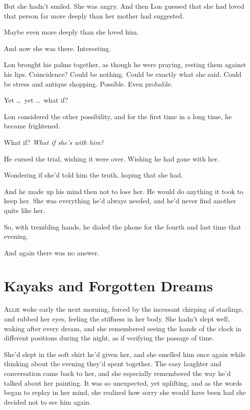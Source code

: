 \documentclass[10pt, twoside, openright]{book}
\newcommand{\chapterornament}[1]{\def\currentornament{#1}}
\def\currentornament{}
\begin{document}
But she hadn't smiled. She was angry. And then Lon guessed that she had
loved that person far more deeply than her mother had suggested.

Maybe even more deeply than she loved him.


And now she was there. Interesting.


Lon brought his palms together, as though he were praying, resting them
against his lips. Coincidence? Could be nothing. Could be exactly what
she said. Could be stress and antique shopping. Possible. Even probable.


Yet   \dots\ yet   \dots\ what if?


Lon considered the other possibility, and for the first time in a long
time, he became frightened.


What if? \emph{What if she's with him?}

He cursed the trial, wishing it were over. Wishing he had gone with her.


Wondering if she'd told him the truth, hoping that she had.

And he made up his mind then not to lose her. He would do anything it
took to keep her. She was everything he'd always needed, and he'd never
find another quite like her.

So, with trembling hands, he dialed the phone for the fourth and last
time that evening.


And again there was no answer.

\chapterornament{89}
\chapter{Kayaks and Forgotten Dreams}

\lettrine[findent=0.3em, nindent=0.0em]{A}{llie} woke early the next morning, forced by the incessant chirping of
starlings, and rubbed her eyes, feeling the stiffness in her body. She
hadn't slept well, waking after every dream, and she remembered seeing
the hands of the clock in different positions during the night, as if
verifying the passage of time.

She'd slept in the soft shirt he'd given her, and she smelled him once
again while thinking about the evening they'd spent together. The easy
laughter and conversation came back to her, and she especially
remembered the way he'd talked about her painting. It was so unexpected,
yet uplifting, and as the words began to replay in her mind, she
realized how sorry she would have been had she decided not to see him
again.
\end{document}
